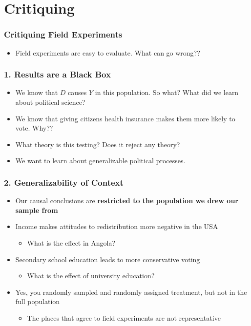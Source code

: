 \documentclass[xcolor=x11names,compress]{beamer}\usepackage[]{graphicx}\usepackage[]{color}
\renewcommand{\(}{\begin{columns}}
\renewcommand{\)}{\end{columns}}
\newcommand{\<}[1]{\begin{column}{#1}}
\renewcommand{\>}{\end{column}}
\begin{document}
\section{Critiquing}

\begin{frame}
\frametitle{Critiquing Field Experiments}
\begin{itemize}
\item Field experiments are easy to evaluate. What can go wrong??
\end{itemize}
\end{frame}

\begin{frame}
\frametitle{1. Results are a Black Box}
\begin{itemize}
\item We know that $D$ causes $Y$ in this population. \pause So what? What did we learn about political science?
\pause
\item We know that giving citizens health insurance makes them more likely to vote. \pause Why??
\pause
\item What theory is this testing? \pause Does it reject any theory?
\pause
\item We want to learn about generalizable political processes.
\end{itemize}
\end{frame}

\begin{frame}
\frametitle{2. Generalizability of Context}
\begin{itemize}
\item Our causal conclusions are \textbf{restricted to the population we drew our sample from}
\pause
\item Income makes attitudes to redistribution more negative in the USA
\pause
\begin{itemize}
\item What is the effect in Angola?
\end{itemize}
\pause
\item Secondary school education leads to more conservative voting
\pause
\begin{itemize}
\item What is the effect of university education?
\end{itemize}
\pause
\item Yes, you randomly sampled and randomly assigned treatment, but not in the full population
\pause
\begin{itemize}
\item The places that agree to field experiments are not representative
\end{itemize}
\end{itemize}
\end{frame}
\end{document}
